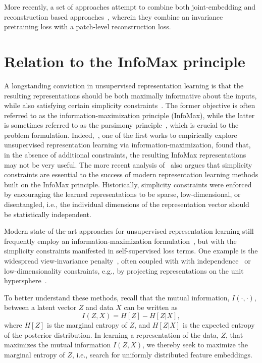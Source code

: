 \documentclass{article} %
\begin{document}
More recently, a set of approaches attempt to combine both joint-embedding and reconstruction based approaches~\cite{zhou2021ibotyes,el2021large}, wherein they combine an invariance pretraining loss with a patch-level reconstruction loss.

\section{Relation to the InfoMax principle}

A longstanding conviction in unsupervised representation learning is that the resulting representations should be both maximally informative about the inputs, while also satisfying certain simplicity constraints~\citep{linsker1988self, goodfellow2016deep}.
The former objective is often referred to as the information-maximization principle (InfoMax), while the latter is sometimes referred to as the parsimony principle~\citep{ma2022principles}, which is crucial to the problem formulation.
Indeed,~\citet{bridle1991unsupervised}, one of the first works to empirically explore unsupervised representation learning via information-maximization, found that, in the absence of additional constraints, the resulting InfoMax representations may not be very useful.
The more recent analysis of~\citet{tschannen2019mutual} also argues that simplicity constraints are essential to the success of modern representation learning methods built on the InfoMax principle.
Historically, simplicity constraints were enforced by encouraging the learned representations to be sparse, low-dimensional, or disentangled, i.e., the individual dimensions of the representation vector should be statistically independent.

Modern state-of-the-art approaches for unsupervised representation learning still frequently employ an information-maximization formulation~\citep{hjelm2018learning, bachman2019learning, krause2010discriminative, hu2017learning, oord2018representation}, but with the simplicity constraints manifested in self-supervised loss terms.
One example is the widespread view-invariance penalty~\citep{misra2020self}, often coupled with with independence~\citep{zbontar2021barlow, bardes2021vicreg} or low-dimensionality constraints, e.g., by projecting representations on the unit hypersphere~\citep{chen2020simple,he2019moco,grill2020bootstrap}.

To better understand these methods, recall that the mutual information, $I(\cdot, \cdot)$, between a latent vector $Z$ and data $X$ can be written as
\[
    I(Z,X) = H[Z] - H[Z|X],
\]
where $H[Z]$ is the marginal entropy of $Z$, and $H[Z|X]$ is the expected entropy of the posterior distribution.
In learning a representation of the data, $Z$, that maximizes the mutual information $I(Z,X)$, we thereby seek to maximize the marginal entropy of $Z$, i.e., search for uniformly distributed feature embeddings.
\end{document}
